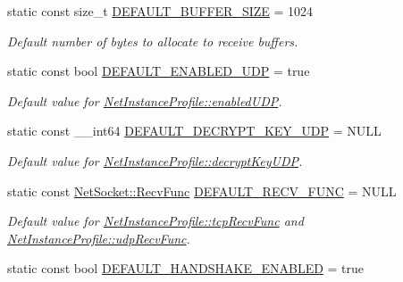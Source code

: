 \begin{DoxyCompactItemize}
\item 
static const size\_\-t \hyperlink{class_net_instance_profile_a285d88534b9936cc603e778aa70d8ec3}{DEFAULT\_\-BUFFER\_\-SIZE} = 1024
\begin{DoxyCompactList}\small\item\em Default number of bytes to allocate to receive buffers. \item\end{DoxyCompactList}\item 
\hypertarget{class_net_instance_profile_aceaa7353038094829951787fcb7ce2b8}{
static const bool \hyperlink{class_net_instance_profile_aceaa7353038094829951787fcb7ce2b8}{DEFAULT\_\-ENABLED\_\-UDP} = true}
\label{class_net_instance_profile_aceaa7353038094829951787fcb7ce2b8}

\begin{DoxyCompactList}\small\item\em Default value for \hyperlink{class_net_instance_profile_add7906378b2fe3ebc0fed461b0e02395}{NetInstanceProfile::enabledUDP}. \item\end{DoxyCompactList}\item 
\hypertarget{class_net_instance_profile_a3468dd5fa20f1c13888bf1d6eed1736a}{
static const \_\-\_\-int64 \hyperlink{class_net_instance_profile_a3468dd5fa20f1c13888bf1d6eed1736a}{DEFAULT\_\-DECRYPT\_\-KEY\_\-UDP} = NULL}
\label{class_net_instance_profile_a3468dd5fa20f1c13888bf1d6eed1736a}

\begin{DoxyCompactList}\small\item\em Default value for \hyperlink{class_net_instance_profile_a0909a6a77030a97700cef25384df37b0}{NetInstanceProfile::decryptKeyUDP}. \item\end{DoxyCompactList}\item 
\hypertarget{class_net_instance_profile_a51f05ca66c76fdc588d34455d5185f6b}{
static const \hyperlink{class_net_socket_a52b5f4de8d0a47fd8620f542b21c076c}{NetSocket::RecvFunc} \hyperlink{class_net_instance_profile_a51f05ca66c76fdc588d34455d5185f6b}{DEFAULT\_\-RECV\_\-FUNC} = NULL}
\label{class_net_instance_profile_a51f05ca66c76fdc588d34455d5185f6b}

\begin{DoxyCompactList}\small\item\em Default value for \hyperlink{class_net_instance_profile_a879b3034d521919570637748adefb6d8}{NetInstanceProfile::tcpRecvFunc} and \hyperlink{class_net_instance_profile_a2825db403a006e006f4f0b6b4b50c0bb}{NetInstanceProfile::udpRecvFunc}. \item\end{DoxyCompactList}\item 
\hypertarget{class_net_instance_profile_a28c3283c29676e4dfbc7ea2428df32b5}{
static const bool \hyperlink{class_net_instance_profile_a28c3283c29676e4dfbc7ea2428df32b5}{DEFAULT\_\-HANDSHAKE\_\-ENABLED} = true}
\label{class_net_instance_profile_a28c3283c29676e4dfbc7ea2428df32b5}


\end{DoxyCompactItemize}
